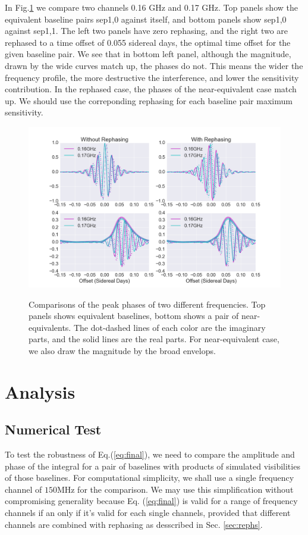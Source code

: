 \documentclass[preprint2,numberedappendix,tighten,twocolappendix]{aastex6}  %
\renewcommand\[{\begin{equation}}
\renewcommand\]{\end{equation}}
\begin{document}
In Fig.\ref{fig:freqdiff} we compare two channels 0.16 GHz and 0.17 GHz.  Top panels show the equivalent baseline pairs sep1,0 against itself, and bottom panels show sep1,0 against sep1,1. The left two panels have zero rephasing, and the right two are rephased to a time offset of 0.055 sidereal days, the optimal time offset for the given baseline pair. We see that in bottom left panel, although the magnitude, drawn by the wide curves match up, the phases do not. This means the wider the frequency profile, the more destructive the interference, and lower the sensitivity contribution. In the rephased case, the phases of the near-equivalent case match up. We should use the correponding rephasing for each baseline pair maximum sensitivity. 

\begin{figure}[H]
\includegraphics[width=1.1\linewidth]{rephs}
\label{fig:freqdiff}
\caption{Comparisons of the peak phases of two different frequencies. Top panels shows equivalent baselines, bottom shows a pair of near-equivalents. The dot-dashed lines of each color are the imaginary parts, and the solid lines are the real parts. For near-equivalent case, we also draw the magnitude by the broad envelops. }
\end{figure}


\section{Analysis}
\subsection{Numerical Test \label{sec:Techniquet}}

To test the robustness of Eq.(\ref{eq:final}), we need to compare the amplitude and phase of the integral
for a pair of baselines with products of simulated visibilities of those baselines. For computational simplicity, we shall use a single frequency channel of $150$MHz for the comparison. We may use this simplification without compromising generality because Eq. (\ref{eq:final}) is valid for a range of frequency channels if an only if it's valid for each single channels, provided that different channels are combined with rephasing as desscribed in Sec. \ref{sec:rephs}. 
\end{document}
